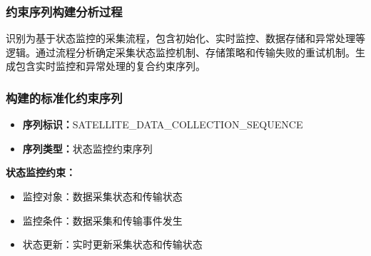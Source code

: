 \documentclass[fontset=windows]{article}
\begin{document}
\subsubsection{约束序列构建分析过程}
识别为基于状态监控的采集流程，包含初始化、实时监控、数据存储和异常处理等逻辑。通过流程分析确定采集状态监控机制、存储策略和传输失败的重试机制。生成包含实时监控和异常处理的复合约束序列。

\subsubsection{构建的标准化约束序列}
\begin{itemize}
    \item \textbf{序列标识：}SATELLITE\_DATA\_COLLECTION\_SEQUENCE
    \item \textbf{序列类型：}状态监控约束序列
\end{itemize}

\textbf{状态监控约束：}
\begin{itemize}
    \item 监控对象：数据采集状态和传输状态
    \item 监控条件：数据采集和传输事件发生
    \item 状态更新：实时更新采集状态和传输状态
\end{itemize}
\end{document}
